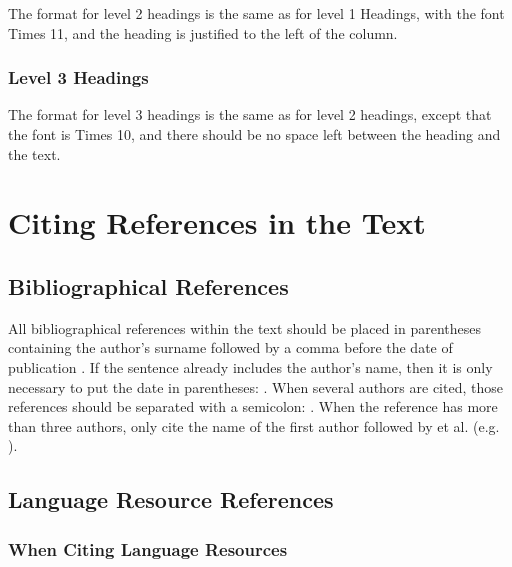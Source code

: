 \documentclass[10pt, a4paper]{article}
\begin{document}
The format for level 2 headings is the same as for level 1 Headings, with the
font Times 11, and the heading is justified to the left of the column.

\subsubsection{Level 3 Headings}

The format for level 3 headings is the same as for level 2 headings, except that
the font is Times 10, and there should be no space left between the heading and
the text.

%

\section{Citing References in the Text}

\subsection{Bibliographical References}

All bibliographical references within the text should be placed in parentheses
containing the author's surname followed by a comma before the date of
publication \cite{Martin-90}. If the sentence already includes the author's
name, then it is only necessary to put the date in parentheses:
. When several authors are cited, those references should be
separated with a semicolon: \cite{Martin-90,CastorPollux-92}. When the reference
has more than three authors, only cite the name of the first author followed by
et al. (e.g. \cite{Superman-Batman-Catwoman-Spiderman-00}).

\subsection{Language Resource References}

\subsubsection{When Citing Language Resources}
\end{document}

